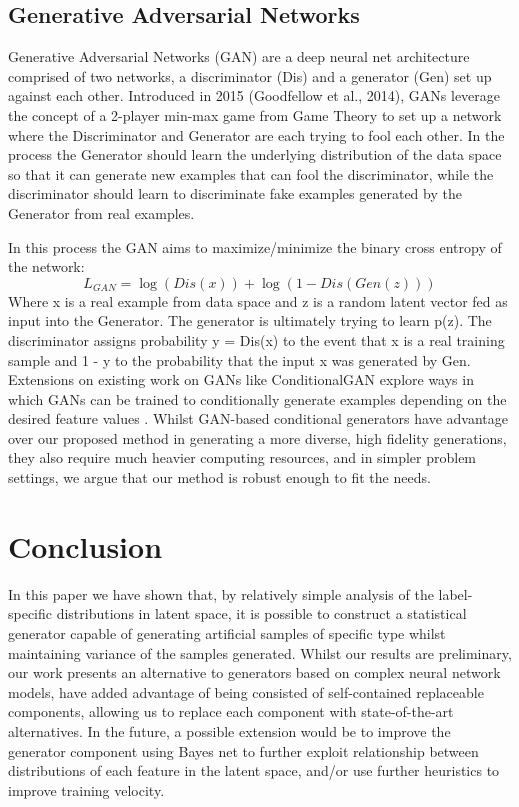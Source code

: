 \documentclass{article}
\begin{document}
\subsection{Generative Adversarial Networks}

Generative Adversarial Networks (GAN) are a deep neural net architecture comprised of two networks, a discriminator (Dis) and a generator (Gen) set up against each other. Introduced in 2015 (Goodfellow et al., 2014), GANs leverage the concept of a 2-player min-max game from Game Theory to set up a network where the Discriminator and Generator are each trying to fool each other. In the process the Generator should learn the underlying distribution of the data space so that it can generate new examples that can fool the discriminator, while the discriminator should learn to discriminate fake examples generated by the Generator from real examples.\par
In this process the GAN aims to maximize/minimize the binary cross entropy of the network:
\begin{equation} 
L_{GAN}=\log(Dis(x))+\log(1-Dis(Gen(z)))
\end{equation}
Where x is a real example from data space and z is a random latent vector fed as input into the Generator. The generator is ultimately trying to learn p(z). The discriminator assigns probability y = Dis(x)  to the event that x is a real training sample and 1 - y to the probability that the input x was generated by Gen. Extensions on existing work on GANs like ConditionalGAN explore ways in which GANs can be trained to conditionally generate examples depending on the desired feature values \cite{Mirza}. Whilst GAN-based conditional generators have advantage over our proposed method in generating a more diverse, high fidelity generations, they also require much heavier computing resources, and in simpler problem settings, we argue that our method is robust enough to fit the needs.

\section{Conclusion}

In this paper we have shown that, by relatively simple analysis of the label-specific distributions in latent space, it is possible to construct a statistical generator capable of generating artificial samples of specific type whilst maintaining variance of the samples generated. Whilst our results are preliminary, our work presents an alternative to generators based on complex neural network models, have added advantage of being consisted of self-contained replaceable components, allowing us to replace each component with state-of-the-art alternatives. In the future, a possible extension would be to improve the generator component using Bayes net to further exploit relationship between distributions of each feature in the latent space, and/or use further heuristics to improve training velocity.

\medskip



\end{document}
